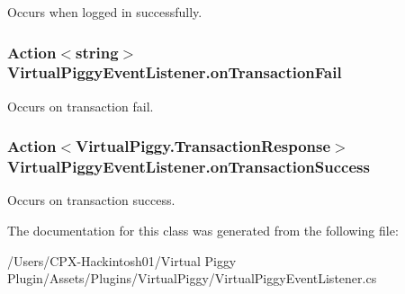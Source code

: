 Occurs when logged in successfully. 

\hypertarget{class_virtual_piggy_event_listener_a2bb1383f9e7fff212815aa3c838180cf}{
\subsubsection[{on\-Transaction\-Fail}]{\setlength{\rightskip}{0pt plus 5cm}Action$<$string$>$ Virtual\-Piggy\-Event\-Listener.\-on\-Transaction\-Fail\hspace{0.3cm}{\ttfamily [static]}}}\label{class_virtual_piggy_event_listener_a2bb1383f9e7fff212815aa3c838180cf}


Occurs on transaction fail. 

\hypertarget{class_virtual_piggy_event_listener_a58bcbdf1f33687818fd58a40bd07eeb3}{
\subsubsection[{on\-Transaction\-Success}]{\setlength{\rightskip}{0pt plus 5cm}Action$<${\bf Virtual\-Piggy.\-Transaction\-Response}$>$ Virtual\-Piggy\-Event\-Listener.\-on\-Transaction\-Success\hspace{0.3cm}{\ttfamily [static]}}}\label{class_virtual_piggy_event_listener_a58bcbdf1f33687818fd58a40bd07eeb3}


Occurs on transaction success. 



The documentation for this class was generated from the following file\-:\begin{DoxyCompactItemize}
\item 
/\-Users/\-C\-P\-X-\/\-Hackintosh01/\-Virtual Piggy Plugin/\-Assets/\-Plugins/\-Virtual\-Piggy/Virtual\-Piggy\-Event\-Listener.\-cs\end{DoxyCompactItemize}
